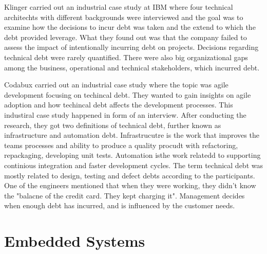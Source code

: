 Klinger carried out an industrial case study at IBM where four technical architechts with different backgrounds were interviewed and the goal was to examine how the decisions to incur debt was taken and the extend to which the debt provided leverage. What they found out was that the company failed to assess the impact of intentionally incurring debt on projects. Decisions regarding technical debt were rarely quantified. There were also big organizational gaps among the business, operational and technical stakeholders, which incurred debt.

Codabux carried out an industrial case study where the topic was agile development focusing on techincal debt. They wanted to gain insights on agile adoption and how techincal debt affects the development processes. This industiral case study happened in form of an interview. After conducting the research, they got two definitions of technical debt, further known as infrastructure and automation debt. Infrastrucutre is the work that improves the teams processes and ability to produce a quality procudt with refactoring, repackaging, developing unit tests. Automation isthe work relatedd to supporting continious integration and faster development cycles. The term technical debt was mostly related to design, testing and defect debts according to the participants. One of the engineers mentioned that when they were working, they didn't know the "balacne of the credit card. They kept charging it". Management decides when enough debt has incurred, and is influenced by the customer needs.











\chapter{Embedded Systems}
